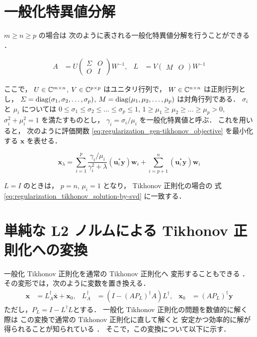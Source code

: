 \section{一般化特異値分解}

$m \ge n \ge p$ の場合は
次のように表される一般化特異値分解を行うことができる \cite{Hansen1998}．

\begin{align}
    A       & =U
    \begin{pmatrix}
        \Sigma & O \\
        O      & I
    \end{pmatrix}
    W^{-1}, &
    L       & =V
    \begin{pmatrix}
        M & O
    \end{pmatrix}
    W^{-1}
\end{align}

ここで，
$U \in \mathbb{C}^{m \times n}$,
$V \in \mathbb{C}^{p \times p}$
はユニタリ行列で，
$W \in \mathbb{C}^{n \times n}$
は正則行列とし，
$\varSigma = \operatorname{diag}(\sigma_1, \sigma_2, \ldots, \sigma_p)$,
$M = \operatorname{diag}(\mu_1, \mu_2, \ldots, \mu_p)$
は対角行列である．
$\sigma_i$ と $\mu_i$ については
$0 \le \sigma_1 \le \sigma_2 \le \ldots \le \sigma_p \le 1$,
$1 \ge \mu_1 \ge \mu_2 \ge \ldots \ge \mu_p > 0$,
$\sigma_i^2 + \mu_i^2 = 1$
を満たすものとし，
$\gamma_i = \sigma_i / \mu_i$
を一般化特異値と呼ぶ．
これを用いると，
次のように評価関数 \eqref{eq:regularization_gen-tikhonov_objective} を最小化する
$\bm{x}$ を表せる\cite{Hansen1998}．

\begin{equation}
    \bm{x}_\lambda =
    \sum_{i=1}^{p} \frac{\gamma_i / \mu_i}{\gamma_i^2+\lambda}
    (\bm{u}_i^*\bm{y}) \bm{w}_i
    +\sum_{i=p+1}^n (\bm{u}_i^*\bm{y}) \bm{w}_i
\end{equation}

$L=I$ のときは，
$p = n$, $\mu_i = 1$ となり，
Tikhonov 正則化の場合の
式 \eqref{eq:regularization_tikhonov_solution-by-svd} に一致する．

\section{単純な L2 ノルムによる Tikhonov 正則化への変換}

一般化 Tikhonov 正則化を通常の Tikhonov 正則化へ
変形することもできる \cite{Hansen1998}．
その変形では，次のように変数を置き換える．
\begin{align}
    \bm{x}      & = L_A^\dagger \bar{\bm{x}} + \bm{x}_0,                     &
    L_A^\dagger & = \left(I - \left(A P_L\right)^\dagger A\right) L^\dagger, &
    \bm{x}_0    & = \left(A P_L\right)^\dagger \bm{y}
    \label{eq:regularization_gen-tikhonov_change-of-variables}
\end{align}
ただし，$P_L = I - L^\dagger L$とする．
一般化 Tikhonov 正則化の問題を数値的に解く際は
この変換で通常の Tikhonov 正則化に直して解くと
安定かつ効率的に解が得られることが知られている \cite{Hansen1998}．
そこで，この変換について以下に示す．

